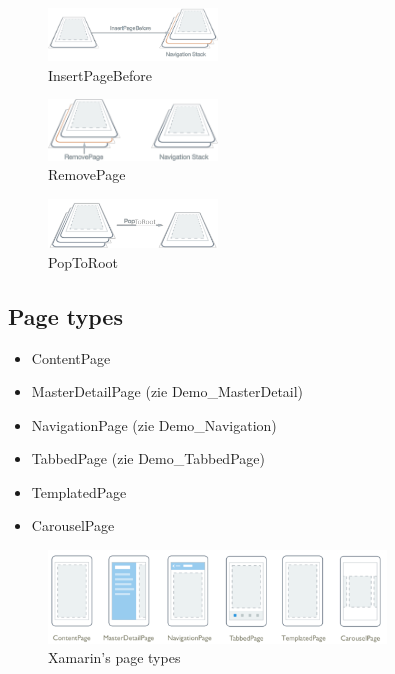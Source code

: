 \documentclass{article}
\begin{document}
\begin{figure}[H]
    \centering
    \includegraphics[width=0.4\textwidth]{navigation-stack-3.png}
    \caption{InsertPageBefore}
\end{figure}

\begin{figure}[H]
    \centering
    \includegraphics[width=0.4\textwidth]{navigation-stack-4.png}
    \caption{RemovePage}
\end{figure}


\begin{figure}[H]
    \centering
    \includegraphics[width=0.4\textwidth]{navigation-stack-5.png}
    \caption{PopToRoot}
\end{figure}

\subsection{Page types}

\begin{itemize}
    \item ContentPage
    \item MasterDetailPage (zie Demo\_MasterDetail)
    \item NavigationPage (zie Demo\_Navigation)
    \item TabbedPage (zie Demo\_TabbedPage)
    \item TemplatedPage
    \item CarouselPage 
\end{itemize}

\begin{figure}[H]
    \centering
    \includegraphics[width=0.8\textwidth]{pagetypes.png}
    \caption{Xamarin's page types}
\end{figure}
\end{document}
